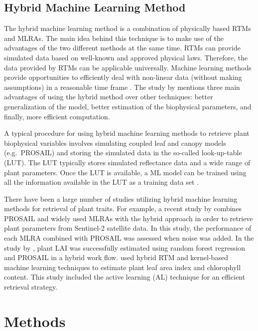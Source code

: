 \documentclass[a4paper, twoside]{templates/ociamthesis}
\begin{document}
\hypertarget{hml}{%
\section{Hybrid Machine Learning Method}\label{hml}}

The hybrid machine learning method is a combination of physically based RTMs and MLRAs. The main idea behind this technique is to make use of the advantages of the two different methods at the same time. RTMs can provide simulated data based on well-known and approved physical laws. Therefore, the data provided by RTMs can be applicable universally. Machine learning methods provide opportunities to efficiently deal with non-linear data (without making assumptions) in a reasonable time frame \citep{abdelbaki2021comparison, de2020quantifying, berger2021survey, ke2016estimating}. The study by \citet{fernandez2021hybrid} mentions three main advantages of using the hybrid method over other techniques: better generalization of the model, better estimation of the biophysical parameters, and finally, more efficient computation.

A typical procedure for using hybrid machine learning methods to retrieve plant biophysical variables involves simulating coupled leaf and canopy models (e.g.~PROSAIL) and storing the simulated data in the so-called look-up-table (LUT). The LUT typically stores simulated reflectance data and a wide range of plant parameters. Once the LUT is available, a ML model can be trained using all the information available in the LUT as a training data set \citep{verrelst2019quantifying}.

There have been a large number of studies utilizing hybrid machine learning methods for retrieval of plant traits. For example, a recent study by \citet{cesar2021exploring} combines PROSAIL and widely used MLRAs with the hybrid approach in order to retrieve plant parameters from Sentinel-2 satellite data. In this study, the performance of each MLRA combined with PROSAIL was assessed when noise was added. In the study by \citet{wei2017estimation}, plant LAI was successfully estimated using random forest regression and PROSAIL in a hybrid work flow. \citet{verrelst2016active} used hybrid RTM and kernel-based machine learning techniques to estimate plant leaf area index and chlorophyll content. This study included the active learning (AL) technique for an efficient retrieval strategy.

\hypertarget{methods}{%
\chapter{Methods}\label{methods}}
\end{document}

